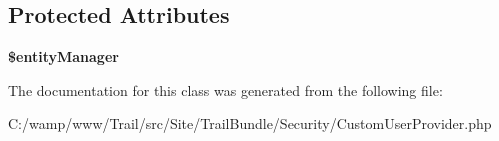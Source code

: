 \subsection*{Protected Attributes}
\begin{DoxyCompactItemize}
\item 
\hypertarget{class_site_1_1_trail_bundle_1_1_security_1_1_custom_user_provider_a63b09dd58f2dc54cd99c7ff4ddca9e7f}{}{\bfseries \$entity\+Manager}\label{class_site_1_1_trail_bundle_1_1_security_1_1_custom_user_provider_a63b09dd58f2dc54cd99c7ff4ddca9e7f}

\end{DoxyCompactItemize}


The documentation for this class was generated from the following file\+:\begin{DoxyCompactItemize}
\item 
C\+:/wamp/www/\+Trail/src/\+Site/\+Trail\+Bundle/\+Security/Custom\+User\+Provider.\+php\end{DoxyCompactItemize}
